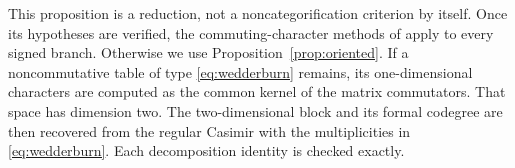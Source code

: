 This proposition is a reduction, not a noncategorification criterion by
itself. Once its hypotheses are verified, the commuting-character
methods of \cite{DP4,DP5} apply to every signed branch. Otherwise we use
Proposition~\ref{prop:oriented}. If a noncommutative table of type
\eqref{eq:wedderburn} remains, its one-dimensional characters are
computed as the common kernel of the matrix commutators. That space has
dimension two. The two-dimensional block and its formal codegree are
then recovered from the regular Casimir with the multiplicities in
\eqref{eq:wedderburn}. Each decomposition identity is checked exactly.









